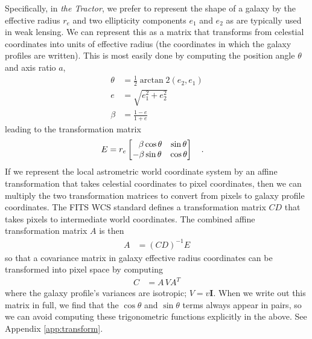 \documentclass[11pt,preprint]{aastex}
\newcommand{\appref}[1]{Appendix \ref{#1}}
\newcommand{\project}[1]{\textsl{#1}}
\newcommand{\transpose}[1]{#1^{T}}
\newcommand{\CD}{C\!D}
\begin{document}
Specifically, in \project{the Tractor}, we prefer to represent the
shape of a galaxy by the effective radius $r_e$ and two ellipticity
components $e_1$ and $e_2$ as are typically used in weak lensing.  We
can represent this as a matrix that transforms from celestial
coordinates into units of effective radius (the coordinates in which
the galaxy profiles are written).  This is most easily done by
computing the position angle $\theta$ and axis ratio $a$,
\begin{align}
%
\theta & = \frac{1}{2} \arctan\!2(e_2, e_1) \\
%
e & = \sqrt{e_1^2 + e_2^2} \\
%
\beta & = \frac{1 - e}{1 + e} \label{eq:a}
\end{align}
leading to the transformation matrix
\begin{align}
E &= r_e \begin{bmatrix}
\textcolor{white}{-}\beta \cos{\theta} & \sin{\theta} \\
-\beta \sin{\theta} & \cos{\theta} \\
\end{bmatrix} \quad .
\end{align}
If we represent the local astrometric world coordinate system by an
affine transformation that takes celestial coordinates to pixel
coordinates, then we can multiply the two transformation matrices to
convert from pixels to galaxy profile coordinates.  The FITS WCS
standard \citep{wcs2} defines a transformation matrix $\CD$ that takes
pixels to intermediate world coordinates.  The combined affine transformation
matrix $A$ is then
\begin{align}
A & = (\CD)^{-1} E
\end{align}
so that a covariance matrix in galaxy effective radius coordinates can
be transformed into pixel space by computing
\begin{align}
C &= A \, V \transpose{A}
\label{eq:vpix}
\end{align}
where the galaxy profile's variances are isotropic; $V = v \bm{I}$.
When we write out this matrix in full, we find that the $\cos{\theta}$
and $\sin{\theta}$ terms always appear in pairs, so we can avoid
computing these trigonometric functions explicitly in the above.  See
\appref{app:transform}.
\end{document}
